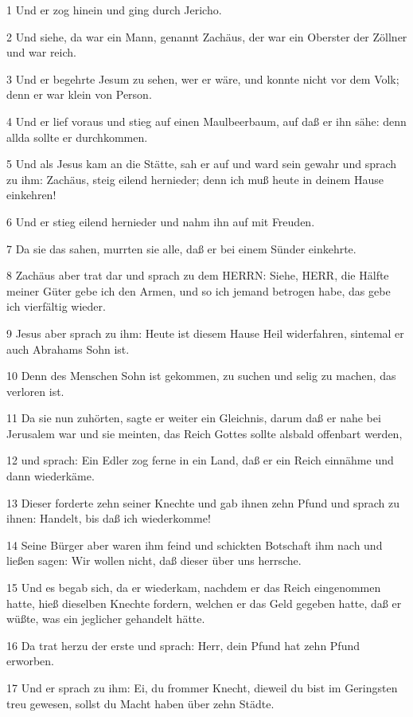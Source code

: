 \par 1 Und er zog hinein und ging durch Jericho.
\par 2 Und siehe, da war ein Mann, genannt Zachäus, der war ein Oberster der Zöllner und war reich.
\par 3 Und er begehrte Jesum zu sehen, wer er wäre, und konnte nicht vor dem Volk; denn er war klein von Person.
\par 4 Und er lief voraus und stieg auf einen Maulbeerbaum, auf daß er ihn sähe: denn allda sollte er durchkommen.
\par 5 Und als Jesus kam an die Stätte, sah er auf und ward sein gewahr und sprach zu ihm: Zachäus, steig eilend hernieder; denn ich muß heute in deinem Hause einkehren!
\par 6 Und er stieg eilend hernieder und nahm ihn auf mit Freuden.
\par 7 Da sie das sahen, murrten sie alle, daß er bei einem Sünder einkehrte.
\par 8 Zachäus aber trat dar und sprach zu dem HERRN: Siehe, HERR, die Hälfte meiner Güter gebe ich den Armen, und so ich jemand betrogen habe, das gebe ich vierfältig wieder.
\par 9 Jesus aber sprach zu ihm: Heute ist diesem Hause Heil widerfahren, sintemal er auch Abrahams Sohn ist.
\par 10 Denn des Menschen Sohn ist gekommen, zu suchen und selig zu machen, das verloren ist.
\par 11 Da sie nun zuhörten, sagte er weiter ein Gleichnis, darum daß er nahe bei Jerusalem war und sie meinten, das Reich Gottes sollte alsbald offenbart werden,
\par 12 und sprach: Ein Edler zog ferne in ein Land, daß er ein Reich einnähme und dann wiederkäme.
\par 13 Dieser forderte zehn seiner Knechte und gab ihnen zehn Pfund und sprach zu ihnen: Handelt, bis daß ich wiederkomme!
\par 14 Seine Bürger aber waren ihm feind und schickten Botschaft ihm nach und ließen sagen: Wir wollen nicht, daß dieser über uns herrsche.
\par 15 Und es begab sich, da er wiederkam, nachdem er das Reich eingenommen hatte, hieß dieselben Knechte fordern, welchen er das Geld gegeben hatte, daß er wüßte, was ein jeglicher gehandelt hätte.
\par 16 Da trat herzu der erste und sprach: Herr, dein Pfund hat zehn Pfund erworben.
\par 17 Und er sprach zu ihm: Ei, du frommer Knecht, dieweil du bist im Geringsten treu gewesen, sollst du Macht haben über zehn Städte.
